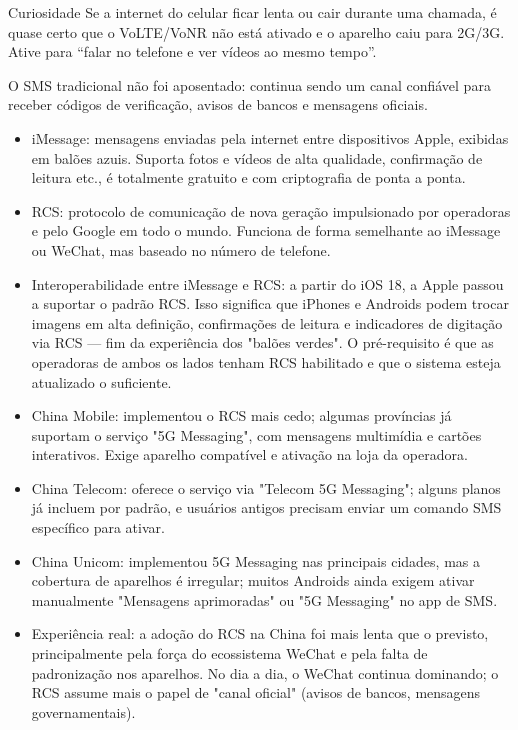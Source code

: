 \begin{tcbinfo}{Curiosidade}
Se a internet do celular ficar lenta ou cair durante uma chamada, é quase certo que o VoLTE/VoNR não está ativado e o aparelho caiu para 2G/3G. Ative para “falar no telefone e ver vídeos ao mesmo tempo”.

\end{tcbinfo}


O SMS tradicional não foi aposentado: continua sendo um canal confiável para receber códigos de verificação, avisos de bancos e mensagens oficiais.

\begin{itemize}
  \item iMessage: mensagens enviadas pela internet entre dispositivos Apple, exibidas em balões azuis. Suporta fotos e vídeos de alta qualidade, confirmação de leitura etc., é totalmente gratuito e com criptografia de ponta a ponta.
  \item RCS: protocolo de comunicação de nova geração impulsionado por operadoras e pelo Google em todo o mundo. Funciona de forma semelhante ao iMessage ou WeChat, mas baseado no número de telefone.
  \item Interoperabilidade entre iMessage e RCS: a partir do iOS 18, a Apple passou a suportar o padrão RCS. Isso significa que iPhones e Androids podem trocar imagens em alta definição, confirmações de leitura e indicadores de digitação via RCS — fim da experiência dos "balões verdes". O pré-requisito é que as operadoras de ambos os lados tenham RCS habilitado e que o sistema esteja atualizado o suficiente.
\end{itemize}


\begin{itemize}
  \item China Mobile: implementou o RCS mais cedo; algumas províncias já suportam o serviço "5G Messaging", com mensagens multimídia e cartões interativos. Exige aparelho compatível e ativação na loja da operadora.
  \item China Telecom: oferece o serviço via "Telecom 5G Messaging"; alguns planos já incluem por padrão, e usuários antigos precisam enviar um comando SMS específico para ativar.
  \item China Unicom: implementou 5G Messaging nas principais cidades, mas a cobertura de aparelhos é irregular; muitos Androids ainda exigem ativar manualmente "Mensagens aprimoradas" ou "5G Messaging" no app de SMS.
  \item Experiência real: a adoção do RCS na China foi mais lenta que o previsto, principalmente pela força do ecossistema WeChat e pela falta de padronização nos aparelhos. No dia a dia, o WeChat continua dominando; o RCS assume mais o papel de "canal oficial" (avisos de bancos, mensagens governamentais).
\end{itemize}

